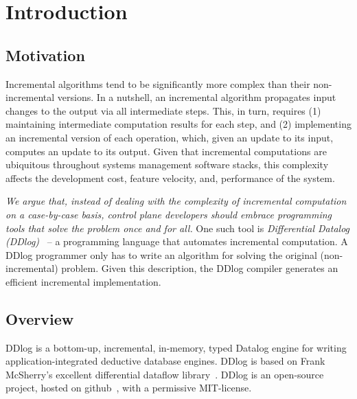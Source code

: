 \section{Introduction}\label{sec-introduction}

\subsection{Motivation}

Incremental algorithms tend to be significantly more complex than
their non-incremental versions.  In a nutshell, an incremental
algorithm propagates input changes to the output via all intermediate
steps.  This, in turn, requires (1) maintaining intermediate
computation results for each step, and (2) implementing an incremental
version of each operation, which, given an update to its input,
computes an update to its output.  Given that incremental computations
are ubiquitous throughout systems management software stacks, this
complexity affects the development cost, feature velocity, and,
performance of the system.

\emph{We argue that, instead of dealing with the complexity of
  incremental computation on a case-by-case basis, control plane
  developers should embrace programming tools that solve the problem
  once and for all.}  One such tool is \emph{Differential Datalog
  (DDlog)}~\cite{ddlog} -- a programming language that automates
incremental computation. A DDlog programmer only has to write an
algorithm for solving the original (non-incremental) problem.  Given
this description, the DDlog compiler generates an efficient
incremental implementation.

\subsection{Overview}

DDlog is a bottom-up, incremental, in-memory, typed Datalog engine for
writing application-integrated deductive database engines. DDlog is
based on Frank McSherry's excellent differential dataflow
library~\cite{differential-dataflow}.  DDlog is an open-source
project, hosted on github~\cite{ddlog}, with a permissive MIT-license.

